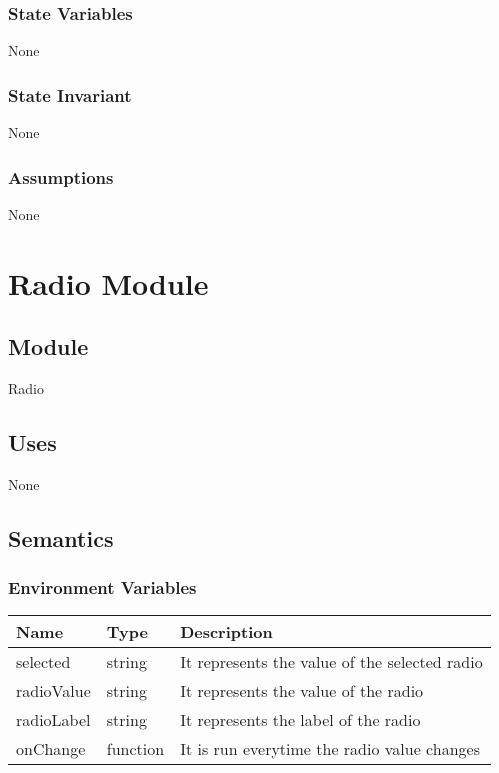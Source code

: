 \documentclass[12pt]{article}
\begin{document}
\subsubsection{State Variables}
None

\subsubsection{State Invariant}
None

\subsubsection{Assumptions}
None

\newpage


\section{Radio Module}

\subsection{Module}
Radio

\subsection{Uses}
None

\subsection{Semantics}

\subsubsection{Environment Variables}
\begin{tabular}{| l | l | p{10cm} |}
    \hline
    \textbf{Name} & \textbf{Type} & \textbf{Description}\\ \hline
    selected & string & It represents the value of the selected radio\\ \hline
    radioValue & string & It represents the value of the radio\\ \hline
    radioLabel & string & It represents the label of the radio\\ \hline
    onChange & function & It is run everytime the radio value changes\\ \hline
\end{tabular}
\end{document}
